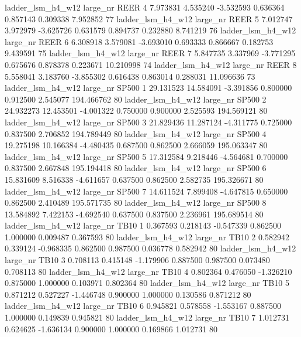   ladder_lsm_h4_w12   large_nr     REER                 4  7.973831  4.535240  -3.532593 0.636364 0.857143  0.309338    7.952852 77
  ladder_lsm_h4_w12   large_nr     REER                 5  7.012747  3.972979  -3.625726 0.631579 0.894737  0.232880    8.741219 76
  ladder_lsm_h4_w12   large_nr     REER                 6  6.308918  3.579081  -3.693010 0.693333 0.866667  0.182753    9.439591 75
  ladder_lsm_h4_w12   large_nr     REER                 7  5.847735  3.337969  -3.771295 0.675676 0.878378  0.223671   10.210998 74
  ladder_lsm_h4_w12   large_nr     REER                 8  5.558041  3.183760  -3.855302 0.616438 0.863014  0.288031   11.096636 73
  ladder_lsm_h4_w12   large_nr    SP500                 1 29.131523 14.584091  -3.391856 0.800000 0.912500  2.545077  194.466762 80
  ladder_lsm_h4_w12   large_nr    SP500                 2 24.932273 12.453501  -4.001322 0.750000 0.900000  2.525593  194.569121 80
  ladder_lsm_h4_w12   large_nr    SP500                 3 21.829436 11.287124  -4.311775 0.725000 0.837500  2.706852  194.789449 80
  ladder_lsm_h4_w12   large_nr    SP500                 4 19.275198 10.166384  -4.480435 0.687500 0.862500  2.666059  195.063347 80
  ladder_lsm_h4_w12   large_nr    SP500                 5 17.312584  9.218446  -4.564681 0.700000 0.837500  2.667848  195.194418 80
  ladder_lsm_h4_w12   large_nr    SP500                 6 15.831609  8.516338  -4.611657 0.637500 0.862500  2.582735  195.326671 80
  ladder_lsm_h4_w12   large_nr    SP500                 7 14.611524  7.899408  -4.647815 0.650000 0.862500  2.410489  195.571735 80
  ladder_lsm_h4_w12   large_nr    SP500                 8 13.584892  7.422153  -4.692540 0.637500 0.837500  2.236961  195.689514 80
  ladder_lsm_h4_w12   large_nr     TB10                 1  0.367593  0.218143  -0.547339 0.862500 1.000000  0.009487    0.367593 80
  ladder_lsm_h4_w12   large_nr     TB10                 2  0.582942  0.339124  -0.968335 0.862500 0.987500  0.036778    0.582942 80
  ladder_lsm_h4_w12   large_nr     TB10                 3  0.708113  0.415148  -1.179906 0.887500 0.987500  0.073480    0.708113 80
  ladder_lsm_h4_w12   large_nr     TB10                 4  0.802364  0.476050  -1.326210 0.875000 1.000000  0.103971    0.802364 80
  ladder_lsm_h4_w12   large_nr     TB10                 5  0.871212  0.527227  -1.446748 0.900000 1.000000  0.130586    0.871212 80
  ladder_lsm_h4_w12   large_nr     TB10                 6  0.945821  0.578558  -1.553167 0.887500 1.000000  0.149839    0.945821 80
  ladder_lsm_h4_w12   large_nr     TB10                 7  1.012731  0.624625  -1.636134 0.900000 1.000000  0.169866    1.012731 80
